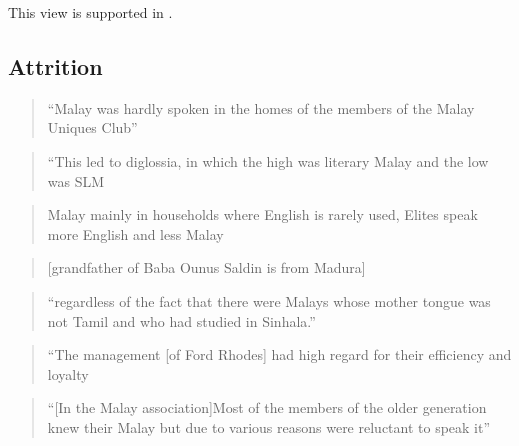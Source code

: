 This view is supported in \citet{Ansaldo2005ms}.

\subsection{Attrition}\label{sec:slmbg:Attrition}

\begin{quote}
    ``Malay was hardly spoken in the homes of the members of the Malay Uniques Club''\citet[83]{Saldin2003}
\end{quote}

\begin{quote}
    ``This led to diglossia, in which the high was literary Malay \el and the low was SLM
\end{quote}


\begin{quote}
    Malay mainly in households where English is rarely used, Elites speak more English and less Malay \citet[30 footnote 10]{Hussainmiya1990}
\end{quote}


\begin{quote}
    [grandfather of Baba Ounus Saldin is from Madura]\citet[82]{Saldin2003}
\end{quote}



\begin{quote}
    ``\el regardless of the fact that there were Malays whose mother tongue was not Tamil and who had studied in Sinhala.''\citet[86]{Saldin2003}
\end{quote}

\begin{quote}
    ``The management [of Ford Rhodes] had high regard for their efficiency and loyalty\citet[8'9]{Saldin2003}
\end{quote}

\begin{quote}
    ``[In the Malay association]Most of the members of the older generation knew their Malay but due to various reasons were reluctant to speak it''\citet[94]{Saldin2003}
\end{quote}

